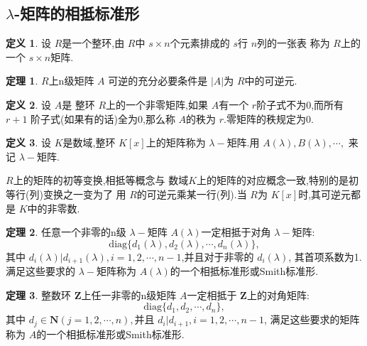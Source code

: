 \documentclass[a4paper,11pt]{article}%
\theoremstyle{remark}
\theoremstyle{definition}
\newtheorem{theorem}{定理}[section]
\theoremstyle{definition}
\newtheorem*{definition}{定义}
\theoremstyle{plain}
\newcommand*{\abs}[1]{\lvert #1 \rvert}
\begin{document}
\subsection{$\lambda$-矩阵的相抵标准形}
\begin{definition}
    设 $R$是一个整环,由 $R$中 $s\times n$个元素排成的 $s$行 $n$列的一张表
    称为 $R$上的一个 $s\times n$矩阵.
\end{definition}
\begin{theorem}
    $R$上n级矩阵 $A$ 可逆的充分必要条件是 $\abs{A}$为 $R$中的可逆元.
\end{theorem}
\begin{definition}
    设 $A$是 整环 $R$上的一个非零矩阵,如果 $A$有一个 $r$阶子式不为0,而所有 $r+1$
    阶子式(如果有的话)全为0,那么称 $A$的秩为 $r$.零矩阵的秩规定为0.
\end{definition}
\begin{definition}
    设 $K$是数域,整环 $K[x]$上的矩阵称为 $\lambda-$矩阵.用 $A(\lambda),B(\lambda),\cdots,$
    来记 $\lambda-$矩阵.
\end{definition}
$R$上的矩阵的初等变换,相抵等概念与 数域$K$上的矩阵的对应概念一致,特别的是初等行(列)变换之一变为了
用 $R$的可逆元乘某一行(列).当 $R$为 $K[x]$时,其可逆元都是 $K$中的非零数.
\begin{theorem}
    任意一个非零的n级 $\lambda-$矩阵 $A(\lambda)$一定相抵于对角 $\lambda-$矩阵:
    \[\text{diag}\{d_1(\lambda),d_2(\lambda),\cdots,d_n(\lambda)\},\]
    其中 $d_i(\lambda)|d_{i+1}(\lambda),i=1,2,\cdots,n-1$,并且对于非零的 $d_i(\lambda)$,
    其首项系数为1.满足这些要求的 $\lambda-$矩阵称为 $A(\lambda)$的一个相抵标准形或Smith标准形.
\end{theorem}
\begin{theorem}
    整数环 $\mathbf{Z}$上任一非零的n级矩阵 $A$一定相抵于 $\mathbf{Z}$上的对角矩阵:
    \[\text{diag}\{d_1,d_2,\cdots,d_n\},\]
    其中 $d_j\in \mathbf{N}(j=1,2,\cdots,n),$并且 $d_i|d_{i+1},i=1,2,\cdots,n-1$,
    满足这些要求的矩阵称为 $A$的一个相抵标准形或Smith标准形.
\end{theorem}
\end{document}
